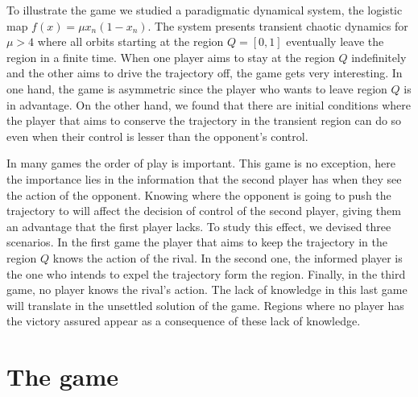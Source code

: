 To illustrate the game we studied a paradigmatic dynamical system, the logistic map ${f(x) = \mu x_n(1-x_n)}$. The system presents transient chaotic dynamics for $\mu>4$ where all orbits starting at the region $Q=[0,1]$ eventually leave the region in a finite time. When one player aims to stay at the region $Q$ indefinitely and the other aims to drive the trajectory off, the game gets very interesting. In one hand, the game is asymmetric since the player who wants to leave region $Q$ is in advantage. On the other hand, we found that there are initial conditions where the player that aims to conserve the trajectory in the transient region can do so even when their control is lesser than the opponent's control.

In many games the order of play is important. This game is no exception, here the importance lies in the information that the second player has when they see the action of the opponent. Knowing where the opponent is going to push the trajectory to will affect the decision of control of the second player, giving them an advantage that the first player lacks. To study this effect, we devised three scenarios. In the first game the player that aims to keep the trajectory in the region $Q$ knows the action of the rival. In the second one, the informed player is the one who intends to expel the trajectory form the region. Finally, in the third game, no player knows the rival's action. The lack of knowledge in this last game will translate in the unsettled solution of the game. Regions where no player has the victory assured appear as a consequence of these lack of knowledge.


\section{The game}


